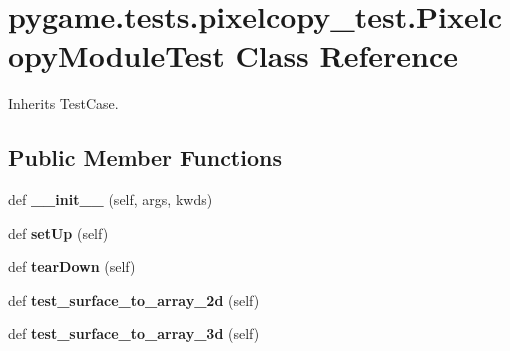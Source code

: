 \hypertarget{classpygame_1_1tests_1_1pixelcopy__test_1_1_pixelcopy_module_test}{}\section{pygame.\+tests.\+pixelcopy\+\_\+test.\+Pixelcopy\+Module\+Test Class Reference}
\label{classpygame_1_1tests_1_1pixelcopy__test_1_1_pixelcopy_module_test}


Inherits Test\+Case.

\subsection*{Public Member Functions}
\begin{DoxyCompactItemize}
\item 
\mbox{\label{classpygame_1_1tests_1_1pixelcopy__test_1_1_pixelcopy_module_test_ae1c03f39d155c28522a3b53098d210d9}} 
def {\bfseries \+\_\+\+\_\+init\+\_\+\+\_\+} (self, args, kwds)
\item 
\mbox{\label{classpygame_1_1tests_1_1pixelcopy__test_1_1_pixelcopy_module_test_aeb475b8ced8dacde47c6d6180173f4fa}} 
def {\bfseries set\+Up} (self)
\item 
\mbox{\label{classpygame_1_1tests_1_1pixelcopy__test_1_1_pixelcopy_module_test_a294a62d621eb86dbe5e0a6972d54996f}} 
def {\bfseries tear\+Down} (self)
\item 
\mbox{\label{classpygame_1_1tests_1_1pixelcopy__test_1_1_pixelcopy_module_test_a10f7dc54a39f1de22159a7c0233175bc}} 
def {\bfseries test\+\_\+surface\+\_\+to\+\_\+array\+\_\+2d} (self)
\item 
\mbox{\label{classpygame_1_1tests_1_1pixelcopy__test_1_1_pixelcopy_module_test_ab73f426a5735d603c3c2547b2493b8eb}} 
def {\bfseries test\+\_\+surface\+\_\+to\+\_\+array\+\_\+3d} (self)
\item 

\end{DoxyCompactItemize}
